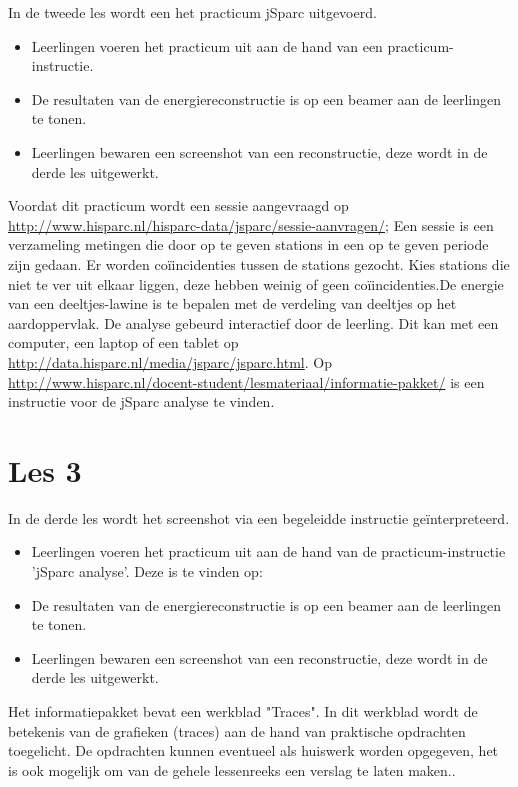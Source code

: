 In de tweede les wordt een het practicum jSparc uitgevoerd.

\begin{itemize}
\item Leerlingen voeren het practicum uit aan de hand van een practicum-instructie.
\item De resultaten van de energiereconstructie is op een beamer aan de leerlingen te tonen.
\item Leerlingen bewaren een screenshot van een reconstructie, deze wordt in de derde les uitgewerkt.
\end{itemize}

Voordat dit practicum wordt een sessie aangevraagd op \url{http://www.hisparc.nl/hisparc-data/jsparc/sessie-aanvragen/}; Een sessie is een verzameling metingen die door op te geven stations in een op te geven periode zijn gedaan. Er worden co\"{i}incidenties tussen de stations gezocht. Kies stations die niet te ver uit elkaar liggen, deze hebben weinig of geen co\"{i}incidenties.De energie van een deeltjes-lawine is te bepalen met de verdeling van deeltjes op het aardoppervlak. De analyse gebeurd interactief door de leerling. Dit kan met een computer, een laptop of een tablet op \url{http://data.hisparc.nl/media/jsparc/jsparc.html}. Op \url{http://www.hisparc.nl/docent-student/lesmateriaal/informatie-pakket/} is een instructie voor de jSparc analyse te vinden. 

\section{Les 3}

In de derde les wordt het screenshot via een begeleidde instructie ge\"interpreteerd.
\begin{itemize}
\item Leerlingen voeren het practicum uit aan de hand van de practicum-instructie 'jSparc analyse'. Deze is te vinden op: \url{}
\item De resultaten van de energiereconstructie is op een beamer aan de leerlingen te tonen.
\item Leerlingen bewaren een screenshot van een reconstructie, deze wordt in de derde les uitgewerkt.
\end{itemize}

Het informatiepakket bevat een werkblad "Traces". In dit werkblad wordt de betekenis van de grafieken (traces) aan de hand van praktische opdrachten toegelicht. De opdrachten kunnen eventueel als huiswerk worden opgegeven, het is ook mogelijk om van de gehele lessenreeks een verslag te laten maken..

